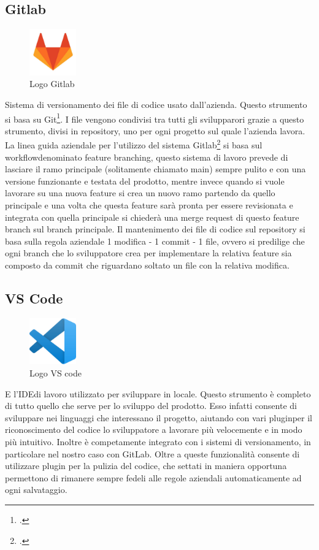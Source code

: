 \subsection*{Gitlab}
\begin{figure}[H]
  \centering
  \includegraphics[width=2cm]{immagini/logo-Gitlab.jpg}
  \caption{Logo Gitlab}
\end{figure}
Sistema di versionamento dei file di codice usato dall'azienda. Questo strumento si basa su Git\footcite{site:git}.
I file vengono condivisi tra tutti gli svilupparori grazie a questo strumento, divisi in \gls{repository}\glsfirstoccur, uno per ogni progetto sul quale l'azienda lavora.
La linea guida aziendale per l'utilizzo del sistema Gitlab\footcite{site:gitlab} si basa sul \gls{workflow}\glsfirstoccur denominato feature branching, questo sistema di lavoro
prevede di lasciare il ramo principale (solitamente chiamato main) sempre pulito e con una versione funzionante e testata del prodotto, mentre invece
quando si vuole lavorare su una nuova feature si crea un nuovo ramo partendo da quello principale e una volta che questa feature sarà pronta per essere
revisionata e integrata con quella principale si chiederà una merge request di questo feature branch sul branch principale.
Il mantenimento dei file di codice sul repository si basa sulla regola aziendale 1 modifica - 1 commit - 1 file, ovvero si predilige che ogni branch che lo sviluppatore
crea per implementare la relativa feature sia composto da commit che riguardano soltato un file con la relativa modifica.

\subsection*{VS Code}
\begin{figure}[H]
  \centering
  \includegraphics[width=2cm]{immagini/logo-VSCode.jpg}
  \caption{Logo VS code}
\end{figure}
E l'\gls{IDE}\glsfirstoccur di lavoro utilizzato per sviluppare in locale. Questo strumento è completo di tutto quello che serve per lo sviluppo del prodotto.
Esso infatti consente di sviluppare nei linguaggi che interessano il progetto, aiutando con vari \gls{plugin}\glsfirstoccur per il riconoscimento del codice lo sviluppatore a lavorare più velocemente e in modo più intuitivo. Inoltre è competamente integrato con i sistemi di
versionamento, in particolare nel nostro caso con GitLab. Oltre a queste funzionalità consente di utilizzare plugin per la pulizia del
codice, che settati in maniera opportuna permettono di rimanere sempre fedeli alle regole aziendali automaticamente ad ogni salvataggio.

